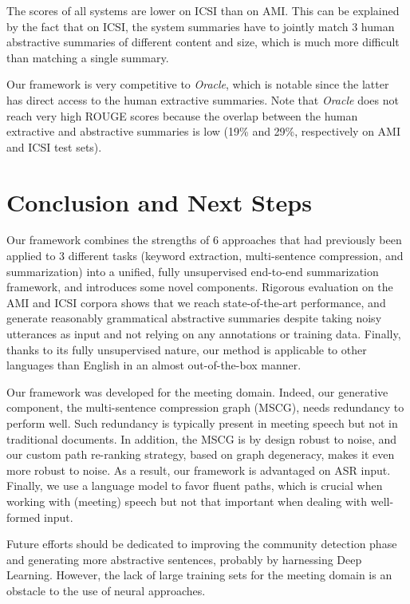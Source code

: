 \documentclass[11pt,a4paper]{article}
\begin{document}
\noindent  The scores of all systems are lower on ICSI than on AMI. This can be explained by the fact that on ICSI, the system summaries have to jointly match 3 human abstractive summaries of different content and size, which is much more difficult than matching a single summary.

\noindent  Our framework is very competitive to \textit{Oracle}, which is notable since the latter has direct access to the human extractive summaries. Note that \textit{Oracle} does not reach very high ROUGE scores because the overlap between the human extractive and abstractive summaries is low (19\% and 29\%, respectively on AMI and ICSI test sets).


\section{Conclusion and Next Steps}
\vspace{-0.1cm}
Our framework combines the strengths of 6 approaches that had previously been applied to 3 different tasks (keyword extraction, multi-sentence compression, and summarization) into a unified, fully unsupervised end-to-end summarization framework, and introduces some novel components. Rigorous evaluation on the AMI and ICSI corpora shows that we reach state-of-the-art performance, and generate reasonably grammatical abstractive summaries despite taking noisy utterances as input and not relying on any annotations or training data. Finally, thanks to its fully unsupervised nature, our method is applicable to other languages than English in an almost out-of-the-box manner.

Our framework was developed for the meeting domain. Indeed, our generative component, the multi-sentence compression graph (MSCG), needs redundancy to perform well. Such redundancy is typically present in meeting speech but not in traditional documents. In addition, the MSCG is by design robust to noise, and our custom path re-ranking strategy, based on graph degeneracy, makes it even more robust to noise. As a result, our framework is advantaged on ASR input. Finally, we use a language model to favor fluent paths, which is crucial when working with (meeting) speech but not that important when dealing with well-formed input.

Future efforts should be dedicated to improving the community detection phase and generating more abstractive sentences, probably by harnessing Deep Learning. However, the lack of large training sets for the meeting domain is an obstacle to the use of neural approaches.
\end{document}

